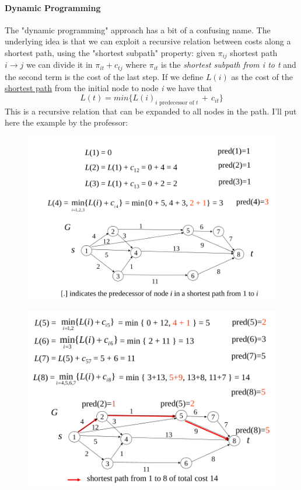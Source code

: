             \paragraph{Dynamic Programming}
                The "dynamic programming" approach has a bit of a confusing name. The underlying idea is that we can exploit a recursive relation between costs along a shortest path, using the "shortest subpath" property: given $\pi_{ij}$ shortest path $i \rightarrow j$ we can divide it in $\pi_{it} + c_{tj}$ where $\pi_{it}$ is the \textit{shortest subpath from i to t} and the second term is the cost of the last step. If we define $L(i)$ as the cost of the \underline{shortest path} from the initial node to node \emph{i} we have that
                \begin{equation}
                    L(t) = min\{ L(i)_{i \text{ predecessor of } t}\, +\, c_{it} \}
                \end{equation}
                This is a recursive relation that can be expanded to all nodes in the path. I'll put here the example by the professor:
                \begin{figure}[H]
                    \centering
                    \includegraphics[width = \textwidth]{./images/DynProg.png}
                \end{figure}
                \begin{figure}[H]
                    \centering
                    \includegraphics[width = \textwidth]{./images/DynProg2.png}
                \end{figure}


